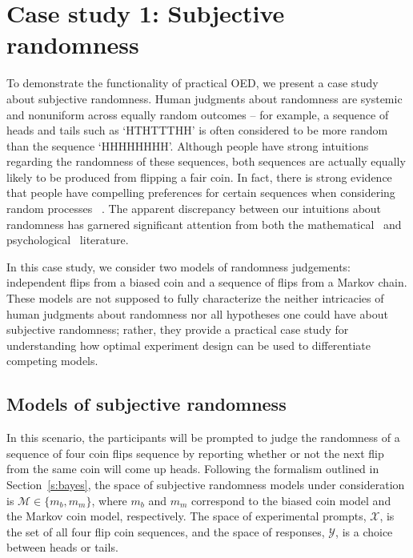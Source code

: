 \documentclass{article}
\begin{document}
\section{Case study 1: Subjective randomness}
\label{s:tutorial}

To demonstrate the functionality of practical OED, we present a case study about subjective randomness. Human judgments about randomness are systemic and nonuniform across equally random outcomes -- for example, a sequence of heads and tails such as `HTHTTTHH' is often considered to be more random than the sequence `HHHHHHHH'. Although people have strong intuitions regarding the randomness of these sequences, both sequences are actually equally likely to be produced from flipping a fair coin. In fact, there is strong evidence that people have compelling preferences for certain sequences when considering random processes ~\cite{goodfellow38:jep}. The apparent discrepancy between our intuitions about randomness has garnered significant attention from both the mathematical~\cite{chaitin01:er, kac83:as, li97:kca} and psychological~\cite{falk81:pme, lopes82:jep, griffiths01:cogsci} literature. 

In this case study, we consider two models of randomness judgements: independent flips from a biased coin and a sequence of flips from a Markov chain. These models are not supposed to fully characterize the neither intricacies of human judgments about randomness nor all hypotheses one could have about subjective randomness; rather, they provide a practical case study for understanding how optimal experiment design can be used to differentiate competing models. 

\subsection{Models of subjective randomness}
\label{s:tutorial:ss:randomness}

In this scenario, the participants will be prompted to judge the randomness of a sequence of four coin flips sequence by reporting whether or not the next flip from the same coin will come up heads. Following the formalism outlined in Section~\ref{s:bayes}, the space of subjective randomness models under consideration is $\mathcal{M} \in \{m_b, m_m\}$, where $m_b$ and $m_m$ correspond to the biased coin model and the Markov coin model, respectively. The space of experimental prompts, $\mathcal{X}$, is the set of all four flip coin sequences, and the space of responses, $\mathcal{Y}$, is a choice between heads or tails.
\end{document}
